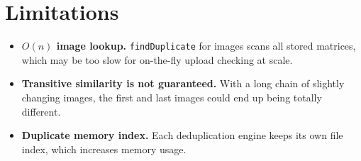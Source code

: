 \section{Limitations}

\begin{itemize}[noitemsep, topsep=2pt]
    \item \textbf{$O(n)$ image lookup.} \texttt{findDuplicate}
        for images scans all stored matrices, which may be too slow for on-the-fly upload checking at scale.

    \item \textbf{Transitive similarity is not guaranteed.}
        With a long chain of slightly changing images, the first and last images could end up being totally different.

    \item \textbf{Duplicate memory index.}
        Each deduplication engine keeps its own file index, which increases memory usage.
\end{itemize}

